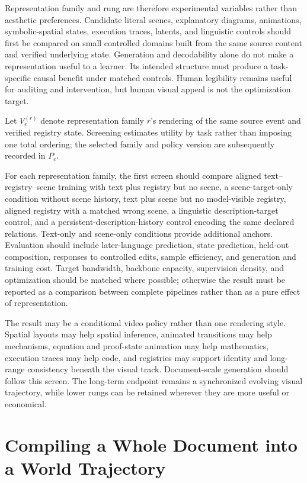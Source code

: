 \documentclass[11pt]{article}
\begin{document}
Representation family and rung are therefore experimental variables rather than aesthetic preferences. Candidate literal scenes, explanatory diagrams, animations, symbolic-spatial states, execution traces, latents, and linguistic controls should first be compared on small controlled domains built from the same source content and verified underlying state. Generation and decodability alone do not make a representation useful to a learner. Its intended structure must produce a task-specific causal benefit under matched controls. Human legibility remains useful for auditing and intervention, but human visual appeal is not the optimization target.

Let $V_e^{(r)}$ denote representation family $r$'s rendering of the same source event and verified registry state. Screening estimates utility by task rather than imposing one total ordering; the selected family and policy version are subsequently recorded in $P_e$.

For each representation family, the first screen should compare aligned text--registry--scene training with text plus registry but no scene, a scene-target-only condition without scene history, text plus scene but no model-visible registry, aligned registry with a matched wrong scene, a linguistic description-target control, and a persistent-description-history control encoding the same declared relations. Text-only and scene-only conditions provide additional anchors. Evaluation should include later-language prediction, state prediction, held-out composition, responses to controlled edits, sample efficiency, and generation and training cost. Target bandwidth, backbone capacity, supervision density, and optimization should be matched where possible; otherwise the result must be reported as a comparison between complete pipelines rather than as a pure effect of representation.

The result may be a conditional video policy rather than one rendering style. Spatial layouts may help spatial inference, animated transitions may help mechanisms, equation and proof-state animation may help mathematics, execution traces may help code, and registries may support identity and long-range consistency beneath the visual track. Document-scale generation should follow this screen. The long-term endpoint remains a synchronized evolving visual trajectory, while lower rungs can be retained wherever they are more useful or economical.

\section{Compiling a Whole Document into a World Trajectory}
\label{sec:compiler}
\end{document}
